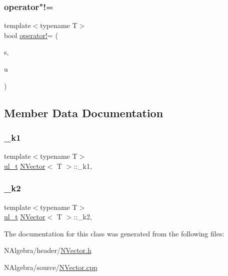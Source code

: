 \subsubsection{\texorpdfstring{operator"!=}{operator!=}\hspace{0.1cm}{\footnotesize\ttfamily [3/3]}}
{\footnotesize\ttfamily template$<$typename T$>$ \\
bool \mbox{\hyperlink{class_n_vector_a697b7e9e059d8045dc5f682f94521548}{operator!}}= (\begin{DoxyParamCaption}\item[{T}]{s,  }\item[{const \mbox{\hyperlink{class_n_vector}{N\+Vector}}$<$ T $>$ \&}]{u }\end{DoxyParamCaption})\hspace{0.3cm}{\ttfamily [friend]}}



\subsection{Member Data Documentation}
\mbox{\label{class_n_vector_a355ee9ef9436669e52d0ff4538f85e27}} 
\subsubsection{\texorpdfstring{\_k1}{\_k1}}
{\footnotesize\ttfamily template$<$typename T$>$ \\
\mbox{\hyperlink{typedef_8h_a1b140a2034db3f5dfe18a987745df43a}{ul\+\_\+t}} \mbox{\hyperlink{class_n_vector}{N\+Vector}}$<$ T $>$\+::\+\_\+k1\hspace{0.3cm}{\ttfamily [mutable]}, {\ttfamily [protected]}}

\mbox{\label{class_n_vector_a6591512e0566996c42f3d74c8174385e}} 
\subsubsection{\texorpdfstring{\_k2}{\_k2}}
{\footnotesize\ttfamily template$<$typename T$>$ \\
\mbox{\hyperlink{typedef_8h_a1b140a2034db3f5dfe18a987745df43a}{ul\+\_\+t}} \mbox{\hyperlink{class_n_vector}{N\+Vector}}$<$ T $>$\+::\+\_\+k2\hspace{0.3cm}{\ttfamily [mutable]}, {\ttfamily [protected]}}



The documentation for this class was generated from the following files\+:\begin{DoxyCompactItemize}
\item 
N\+Algebra/header/\mbox{\hyperlink{_n_vector_8h}{N\+Vector.\+h}}\item 
N\+Algebra/source/\mbox{\hyperlink{_n_vector_8cpp}{N\+Vector.\+cpp}}\end{DoxyCompactItemize}
